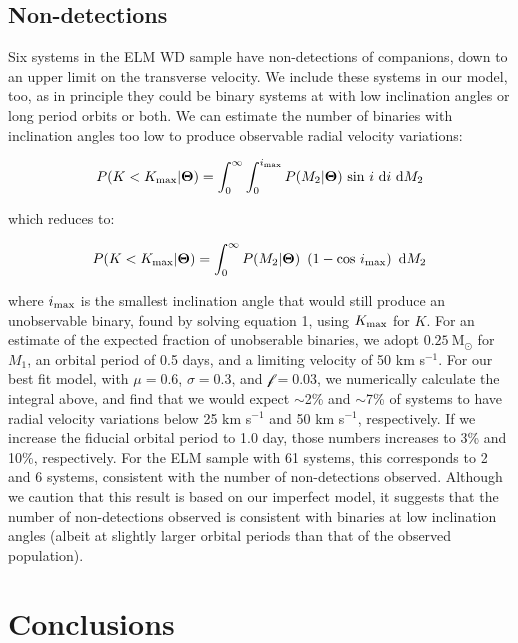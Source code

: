 \documentclass[letterpaper,12pt,preprint]{aastex}
\newcommand{\Msun}{\mathrm{M}_\odot}
\begin{document}
\subsection{Non-detections}

Six systems in the ELM WD sample have non-detections of companions, down to an upper limit on the transverse velocity. We include these systems in our model, too, as in principle they could be binary systems at with low inclination angles or long period orbits or both. We can estimate the number of binaries with inclination angles too low to produce observable radial velocity variations:

\begin{equation}
P(K<K_{\rm max} | \mathbf{\Theta}) = \int_0^{\infty} \int_0^{i_{\rm max}} P(M_2|\mathbf{\Theta})\ {\rm sin}\ i\ {\rm d}i\ {\rm d}M_2
\end{equation}

which reduces to:

\begin{equation}
P(K<K_{\rm max} | \mathbf{\Theta}) = \int_0^{\infty} P(M_2|\mathbf{\Theta})\ \left( 1 - {\rm cos}\ i_{\rm max}\right)\ {\rm d}M_2
\end{equation}

where $i_{\rm max}$ is the smallest inclination angle that would still produce an unobservable binary, found by solving equation 1, using $K_{\rm max}$ for $K$. For an estimate of the expected fraction of unobserable binaries, we adopt $0.25~\Msun$ for $M_1$, an orbital period of 0.5 days, and a limiting velocity of 50 km s$^{-1}$. For our best fit model, with $\mu=0.6$, $\sigma=0.3$, and $\mathcal{f}=0.03$, we numerically calculate the integral above, and find that we would expect $\sim$2\% and $\sim$7\% of systems to have radial velocity variations below 25 km s$^{-1}$ and 50 km s$^{-1}$, respectively. If we increase the fiducial orbital period to 1.0 day, those numbers increases to 3\% and 10\%, respectively. For the ELM sample with 61 systems, this corresponds to 2 and 6 systems, consistent with the number of non-detections observed. Although we caution that this result is based on our imperfect model, it suggests that the number of non-detections observed is consistent with binaries at low inclination angles (albeit at slightly larger orbital periods than that of the observed population).


\section{Conclusions}
\end{document}

